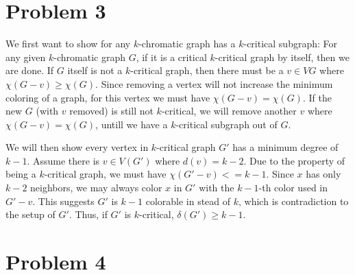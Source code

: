 \documentclass[11pt]{article}
\begin{document}
\section*{Problem 3}

We first want to show for any $k$-chromatic graph has a $k$-critical subgraph: For any given $k$-chromatic graph $G$, if it is a critical $k$-critical graph by itself, then we are done. If $G$ itself is not a $k$-critical graph, then there must be a $v \in V{G}$ where $\chi(G-v) \geq \chi(G)$. Since removing a vertex will not increase the minimum coloring of a graph, for this vertex we must have $\chi(G-v) = \chi(G)$. If the new $G$ (with $v$ removed) is still not $k$-critical, we will remove another $v$ where $\chi(G-v) = \chi(G)$, untill we have a $k$-critical subgraph out of $G$.\newline

We will then show every vertex in $k$-critical graph $G'$ has a minimum degree of $k-1$. Assume there is $v \in V(G')$ where $d(v) = k-2$. Due to the property of being a $k$-critical graph, we must have $\chi(G'-v) <= k - 1$. Since $x$ has only $k-2$ neighbors, we may always color $x$ in $G'$ with the $k-1$-th color used in $G' - v$. This suggests $G'$ is $k-1$ colorable in stead of $k$, which is contradiction to the setup of $G'$. Thus, if $G'$ is $k$-critical, $\delta(G') \geq k - 1$.


\section*{Problem 4}
%
% 
% 
\end{document}
